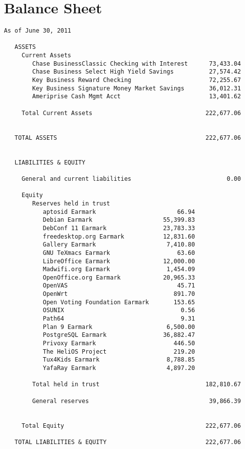 \documentclass[letterpaper]{report}
\begin{document}
\section{Balance Sheet}

\begin{verbatim}
As of June 30, 2011

   ASSETS
     Current Assets
        Chase BusinessClassic Checking with Interest      73,433.04
        Chase Business Select High Yield Savings          27,574.42
        Key Business Reward Checking                      72,255.67
        Key Business Signature Money Market Savings       36,012.31
        Ameriprise Cash Mgmt Acct                         13,401.62

     Total Current Assets                                222,677.06


   TOTAL ASSETS                                          222,677.06


   LIABILITIES & EQUITY

     General and current liabilities                           0.00

     Equity
        Reserves held in trust
           aptosid Earmark                       66.94
           Debian Earmark                    55,399.83
           DebConf 11 Earmark                23,783.33
           freedesktop.org Earmark           12,831.60
           Gallery Earmark                    7,410.80
           GNU TeXmacs Earmark                   63.60
           LibreOffice Earmark               12,000.00
           Madwifi.org Earmark                1,454.09
           OpenOffice.org Earmark            20,965.33
           OpenVAS                               45.71
           OpenWrt                              891.70
           Open Voting Foundation Earmark       153.65
           OSUNIX                                 0.56
           Path64                                 9.31
           Plan 9 Earmark                     6,500.00
           PostgreSQL Earmark                36,882.47
           Privoxy Earmark                      446.50
           The HeliOS Project                   219.20
           Tux4Kids Earmark                   8,788.85
           YafaRay Earmark                    4,897.20

        Total held in trust                              182,810.67

        General reserves                                  39,866.39


     Total Equity                                        222,677.06

   TOTAL LIABILITIES & EQUITY                            222,677.06
\end{verbatim}
\end{document}
